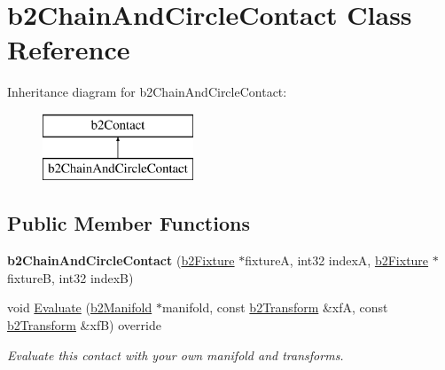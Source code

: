 \hypertarget{classb2ChainAndCircleContact}{}\section{b2\+Chain\+And\+Circle\+Contact Class Reference}
\label{classb2ChainAndCircleContact}
Inheritance diagram for b2\+Chain\+And\+Circle\+Contact\+:\begin{figure}[H]
\begin{center}
\leavevmode
\includegraphics[height=2.000000cm]{classb2ChainAndCircleContact}
\end{center}
\end{figure}
\subsection*{Public Member Functions}
\begin{DoxyCompactItemize}
\item 
\mbox{\label{classb2ChainAndCircleContact_a7303997b9af2b859346b4fc4d7e107d5}} 
{\bfseries b2\+Chain\+And\+Circle\+Contact} (\mbox{\hyperlink{classb2Fixture}{b2\+Fixture}} $\ast$fixtureA, int32 indexA, \mbox{\hyperlink{classb2Fixture}{b2\+Fixture}} $\ast$fixtureB, int32 indexB)
\item 
\mbox{\label{classb2ChainAndCircleContact_abdc7f895b76f99f7ddc444ed11986c89}} 
void \mbox{\hyperlink{classb2ChainAndCircleContact_abdc7f895b76f99f7ddc444ed11986c89}{Evaluate}} (\mbox{\hyperlink{structb2Manifold}{b2\+Manifold}} $\ast$manifold, const \mbox{\hyperlink{structb2Transform}{b2\+Transform}} \&xfA, const \mbox{\hyperlink{structb2Transform}{b2\+Transform}} \&xfB) override
\begin{DoxyCompactList}\small\item\em Evaluate this contact with your own manifold and transforms. \end{DoxyCompactList}\end{DoxyCompactItemize}
